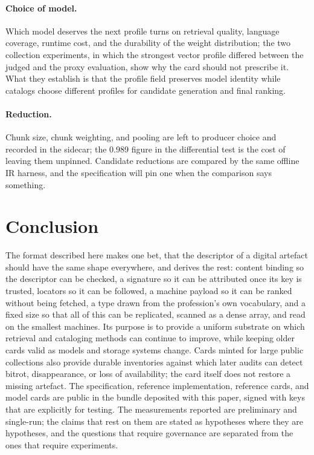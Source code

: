 \documentclass[11pt]{article}
\begin{document}
\paragraph{Choice of model.} Which model deserves the next profile turns on
retrieval quality, language coverage, runtime cost, and the durability of the
weight distribution; the two collection experiments, in which the strongest
vector profile differed between the judged and the proxy evaluation, show
why the card should not prescribe it. What they establish is that the profile
field preserves model identity while catalogs choose different profiles for
candidate generation and final ranking.

\paragraph{Reduction.} Chunk size, chunk weighting, and pooling are left to
producer choice and recorded in the sidecar; the 0.989 figure in the
differential test is the cost of leaving them unpinned. Candidate reductions
are compared by the same offline IR harness, and the specification will pin
one when the comparison says something.

\section{Conclusion}

The format described here makes one bet, that the descriptor of a digital
artefact should have the same shape everywhere, and derives the rest: content
binding so the descriptor can be checked, a signature so it can be attributed
once its key is trusted, locators so it can be followed, a machine payload so
it can be ranked without being fetched, a type drawn from the profession's
own vocabulary, and a fixed size so that all of this can be replicated,
scanned as a dense array, and read on the smallest machines. Its purpose is
to provide a uniform substrate on
which retrieval and cataloging methods can continue to improve, while keeping
older cards valid as models and storage systems change. Cards minted for
large public collections also provide durable inventories against which later
audits can detect bitrot, disappearance, or loss of availability; the card
itself does not restore a missing artefact. The specification, reference
implementation, reference cards, and model cards are public in the bundle
deposited with this paper, signed with keys that are explicitly for testing.
The measurements reported are preliminary and single-run; the claims that
rest on them are stated as hypotheses where they are hypotheses, and the
questions that require governance are separated from the ones that require
experiments.
\end{document}
